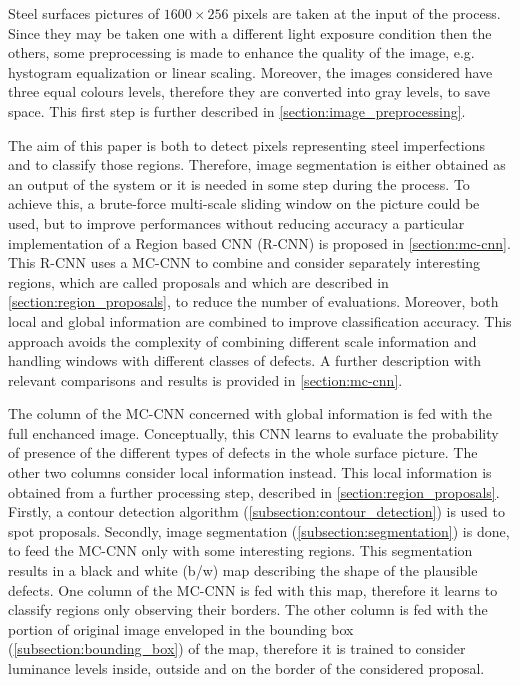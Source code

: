     \par{
        Steel surfaces pictures of $1600\times 256$ pixels are taken at the input of the process. Since they may be taken one with a different light exposure condition then the others, some preprocessing is made to enhance the quality of the image, e.g. hystogram equalization or linear scaling. Moreover, the images considered have three equal colours levels, therefore they are converted into gray levels, to save space. This first step is further described in \ref{section:image_preprocessing}.
    }
    \par{
        The aim of this paper is both to detect pixels representing steel imperfections and to classify those regions. Therefore, image segmentation is either obtained as an output of the system or it is needed in some step during the process. To achieve this, a brute-force multi-scale sliding window on the picture could be used, but to improve performances without reducing accuracy a particular implementation of a Region based CNN (R-CNN) \cite{ieee:7410526,ieee:7532516} is proposed in \ref{section:mc-cnn}. This R-CNN uses a MC-CNN to combine and consider separately interesting regions, which are called proposals and which are described in \ref{section:region_proposals}, to reduce the number of evaluations. Moreover, both local and global information are combined to improve classification accuracy. This approach avoids the complexity of combining different scale information and handling windows with different classes of defects. A further description with relevant comparisons and results is provided in \ref{section:mc-cnn}.
    }
    \par{
        The column of the MC-CNN concerned with global information is fed with the full enchanced image. Conceptually, this CNN learns to evaluate the probability of presence of the different types of defects in the whole surface picture. The other two columns consider local information instead. This local information is obtained from a further processing step, described in \ref{section:region_proposals}. Firstly, a contour detection algorithm (\ref{subsection:contour_detection}) is used to spot proposals. Secondly, image segmentation (\ref{subsection:segmentation}) is done, to feed the MC-CNN only with some interesting regions. This segmentation results in a black and white (b/w) map describing the shape of the plausible defects. One column of the MC-CNN is fed with this map, therefore it learns to classify regions only observing their borders. The other column is fed with the portion of original image enveloped in the bounding box (\ref{subsection:bounding_box}) of the map, therefore it is trained to consider luminance levels inside, outside and on the border of the considered proposal.
    }

